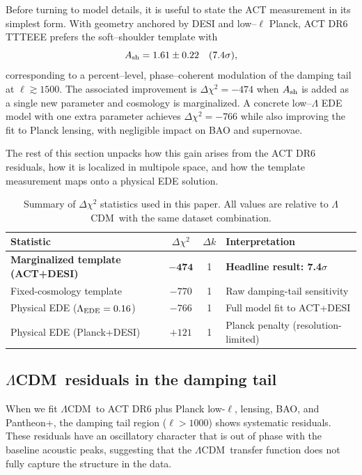 \documentclass[onecolumn,showpacs,preprintnumbers,amsmath,amssymb,prd]{revtex4-2}
\newcommand{\lcdm}{$\Lambda$CDM}
\begin{document}
Before turning to model details, it is useful to state the ACT measurement in
its simplest form. With geometry anchored by DESI and low--$\ell$ Planck, ACT
DR6 TTTEEE prefers the soft--shoulder template with
\begin{equation}
A_{\rm sh} = 1.61 \pm 0.22 \quad (7.4\sigma),
\end{equation}
corresponding to a percent--level, phase--coherent modulation of the damping
tail at $\ell \gtrsim 1500$. The associated improvement is
$\Delta\chi^2 = -474$ when $A_{\rm sh}$ is added as a single new parameter and
cosmology is marginalized. A concrete low--$\Lambda$ EDE model with one extra 
parameter achieves $\Delta\chi^2 = -766$ while also improving the fit
to Planck lensing, with negligible impact on BAO and supernovae.

The rest of this section unpacks how this gain arises from the ACT DR6
residuals, how it is localized in multipole space, and how the template
measurement maps onto a physical EDE solution.

\begin{table}[h]
\centering
\caption{Summary of $\Delta\chi^2$ statistics used in this paper. All values 
are relative to \lcdm\ with the same dataset combination.}
\label{tab:chisq_summary}
\begin{tabular}{lccp{5cm}}
\toprule
Statistic & $\Delta\chi^2$ & $\Delta k$ & Interpretation \\
\midrule
\textbf{Marginalized template (ACT+DESI)} & $\mathbf{-474}$ & 1 & \textbf{Headline result: 7.4$\sigma$} \\
Fixed-cosmology template & $-770$ & 1 & Raw damping-tail sensitivity \\
Physical EDE ($\Lambda_{\rm EDE} = 0.16$) & $-766$ & 1 & Full model fit to ACT+DESI \\
Physical EDE (Planck+DESI) & $+121$ & 1 & Planck penalty (resolution-limited) \\
\bottomrule
\end{tabular}
\end{table}

\subsection{\lcdm\ residuals in the damping tail}

When we fit \lcdm\ to ACT DR6 plus Planck low-$\ell$, lensing, BAO, and Pantheon+, 
the damping tail region ($\ell > 1000$) shows systematic residuals. These residuals 
have an oscillatory character that is out of phase with the baseline acoustic peaks, 
suggesting that the \lcdm\ transfer function does not fully capture the structure 
in the data.
\end{document}
